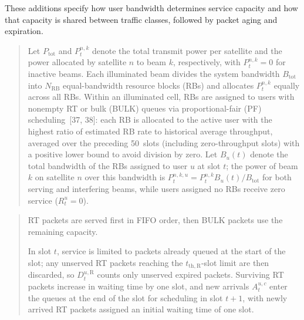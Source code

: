 \documentclass[11pt,a4paper]{article}
\begin{document}
These additions specify how user bandwidth determines service capacity and how that capacity is shared between traffic classes, followed by packet aging and expiration.
\par


\begin{quote}\small\color{revisionblue}
Let $P_{\mathrm{tot}}$ and $P_t^{n,k}$ denote the total transmit power per satellite and the power allocated by satellite $n$ to beam $k$, respectively, with $P_t^{n,k}=0$ for inactive beams. Each illuminated beam divides the system bandwidth $B_{\mathrm{tot}}$ into $N_{\mathrm{RB}}$ equal-bandwidth resource blocks (RBs) and allocates $P_t^{n,k}$ equally across all RBs. Within an illuminated cell, RBs are assigned to users with nonempty RT or bulk (BULK) queues via proportional-fair (PF) scheduling~[37, 38]: each RB is allocated to the active user with the highest ratio of estimated RB rate to historical average throughput, averaged over the preceding 50~slots (including zero-throughput slots) with a positive lower bound to avoid division by zero. Let $B_u(t)$ denote the total bandwidth of the RBs assigned to user $u$ at slot $t$; the power of beam $k$ on satellite $n$ over this bandwidth is $P_t^{n,k,u}=P_t^{n,k}B_u(t)/B_{\mathrm{tot}}$ for both serving and interfering beams, while users assigned no RBs receive zero service ($R_t^u=0$).
\par
\end{quote}


\begin{quote}\small\color{revisionblue}
RT packets are served first in FIFO order, then BULK packets use the remaining capacity.
\par

In slot $t$, service is limited to packets already queued at the start of the slot; any unserved RT packets reaching the $t_{\mathrm{th},\mathrm{R}}$-slot limit are then discarded, so $D_t^{u,\mathrm{R}}$ counts only unserved expired packets. Surviving RT packets increase in waiting time by one slot, and new arrivals $A_t^{u,c}$ enter the queues at the end of the slot for scheduling in slot $t+1$, with newly arrived RT packets assigned an initial waiting time of one slot.
\par
\end{quote}
\end{document}

